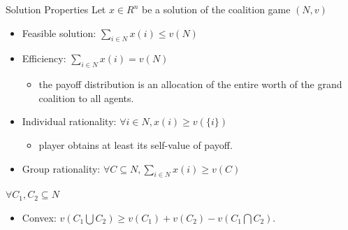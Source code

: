 \documentclass{beamer}
\begin{document}
\begin{frame}{Solution Properties}
    Let $x \in R^n$ be a solution of the coalition game $(N,v)$
    \begin{itemize}
        \item {\color{blue} Feasible solution:} $\sum_{i \in N} x(i) \leq v(N)$
        \item {\color{blue} Efficiency:} $\sum_{i \in N} x(i) = v(N)$
        \begin{itemize}
            \item the payoff distribution is an allocation of the entire worth of the grand coalition to all agents.
        \end{itemize}
        \item {\color{blue} Individual rationality:} $\forall i \in N, x(i) \geq v(\{i\})$
        \begin{itemize}
            \item player obtains at least its self-value of payoff.
        \end{itemize}
        \item {\color{blue} Group rationality:} $\forall C \subseteq N, \sum_{i \in N} x(i) \geq v(C)$
    \end{itemize}

    \vspace{0.3cm}

    $\forall C_1,C_2 \subseteq N$
    \begin{itemize}
        \item {\color{blue} Convex:} $v(C_1 \bigcup C_2) \geq v(C_1) + v(C_2) - v(C_1 \bigcap C_2)$.
    \end{itemize}

\end{frame}
\end{document}
